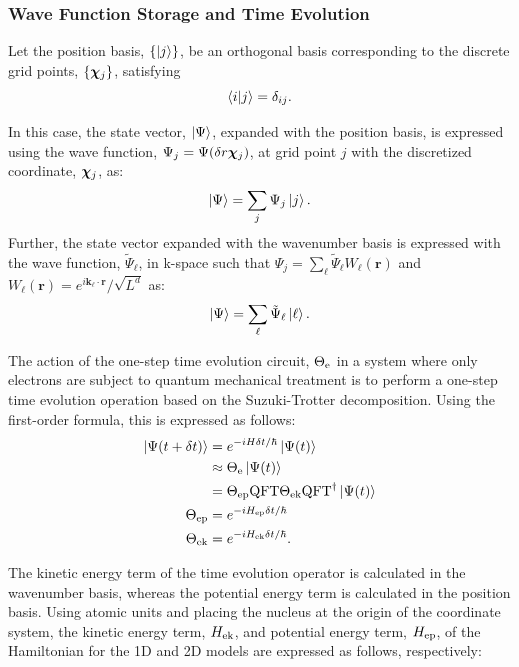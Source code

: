 \documentclass[aip-draft.tex]{subfiles}
\begin{document}
\subsubsection{Wave Function Storage and Time Evolution}
Let the position basis, $\{\ket{j}\}$, be an orthogonal basis corresponding to the
discrete grid points, $\{\bm{\chi}_{j}\}$, satisfying
\begin{equation}
\braket{i|j}=\delta_{ij}.
\end{equation}

In this case, the state vector, $\ket{\Psi}$, expanded with the position basis, is
expressed using the wave function, $\Psi_j=\Psi(\delta r\bm{\chi}_{j})$, at grid point
$j$ with the discretized coordinate, $\bm{\chi}_{j}$, as:
\begin{equation}
\ket{\Psi} = \sum_{j}\Psi_j\ket{j}.
\end{equation}
Further, the state vector expanded with the wavenumber basis is expressed with
the wave function, $\tilde{\Psi}_{\ell}$, in k-space such that
$\Psi_j=\sum_{\ell} \tilde{\Psi}_{\ell}W_{\ell}(\bm{r})$ and
$W_{\ell}(\bm{r})=e^{i\bm{k}_{\ell}\cdot\bm{r}}/\sqrt{L^d}$ as:
\begin{equation}
\ket{\Psi} = \sum_{\ell}\tilde{\Psi}_{\ell}\ket{\ell}.
\end{equation}

The action of the one-step time evolution circuit, $\Theta_{\mathrm{e}}$ in a system where
only electrons are subject to quantum mechanical treatment is to perform a
one-step time evolution operation based on the Suzuki-Trotter decomposition.
Using the first-order formula, this is expressed as follows:
\begin{align}
\ket{\Psi(t+\delta t)}
 &= e^{-iH\delta t/\hbar}\ket{\Psi(t)} \notag \\
 &\approx \Theta_{\mathrm{e}} \ket{\Psi(t)} \label{eq:circuit-eval-theta-e}\\
 &= \Theta_{\mathrm{ep}}\mathrm{QFT}\Theta_{\mathrm{ek}}\mathrm{QFT}^\dagger\ket{\Psi(t)}\\
    \Theta_{\mathrm{ep}}&=e^{-iH_{\mathrm{ep}}\delta t/\hbar}\\
    \Theta_{\mathrm{ek}}&=e^{-iH_{\mathrm{ek}}\delta t/\hbar}.
\end{align}

The kinetic energy term of the time evolution operator is calculated in the
wavenumber basis, whereas the potential energy term is calculated in the
position basis. Using atomic units and placing the nucleus at the origin of the
coordinate system, the kinetic energy term, $H_{\mathrm{ek}}$, and potential energy term,
$H_{\mathrm{ep}}$, of the Hamiltonian for the 1D and 2D models are expressed as follows,
respectively:
\end{document}
